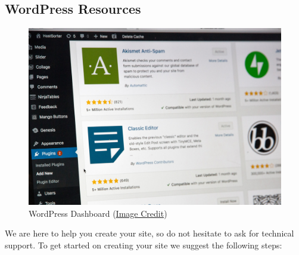 \documentclass[
]{book}
\begin{document}
\hypertarget{wordpress-resources}{%
\subsection*{WordPress Resources}\label{wordpress-resources}}

\begin{figure}
\centering
\includegraphics{assets/u1/stephen-phillips-hostreviews-co-uk-sSPzmL7fpWc-unsplash.jpg}
\caption{WordPress Dashboard (\href{https://unsplash.com/photos/sSPzmL7fpWc}{Image Credit})}
\end{figure}

We are here to help you create your site, so do not hesitate to ask for technical support. To get started on creating your site we suggest the following steps:
\end{document}

